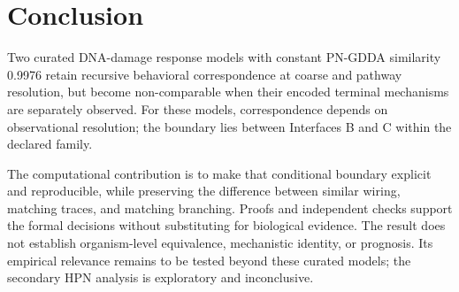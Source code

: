 \section{Conclusion}\label{sec:conclusion}

Two curated DNA-damage response models with constant PN-GDDA similarity 0.9976
retain recursive behavioral correspondence at coarse and pathway resolution,
but become non-comparable when their encoded terminal mechanisms are separately
observed. For these models, correspondence depends on observational resolution;
the boundary lies between Interfaces B and C within the declared family.

The computational contribution is to make that conditional boundary explicit
and reproducible, while preserving the difference between similar wiring,
matching traces, and matching branching. Proofs and independent checks support
the formal decisions without substituting for biological evidence. The result
does not establish organism-level equivalence, mechanistic identity, or
prognosis. Its empirical relevance remains to be tested beyond these curated
models; the secondary HPN analysis is exploratory and inconclusive.
